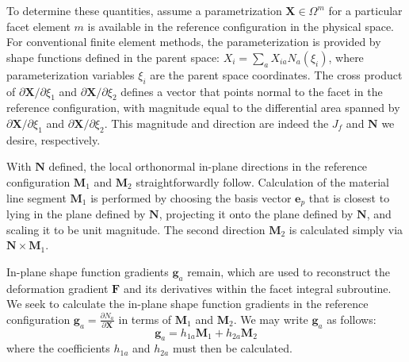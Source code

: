 To determine these quantities, assume a parametrization $\bm{X} \in \Omega^m$ for a particular facet element $m$ is available in the reference configuration in the physical space. For conventional finite element methods, the parameterization is provided by shape functions defined in the parent space: ${X}_{i} = \sum\limits_{a}{X}_{ia}{N}_a(\xi_i)$, where parameterization variables $\xi_i$ are the parent space coordinates. The cross product of ${\partial{\bm {X}}}/{\partial \xi_1}$ and ${\partial{\bm {X}}}/{\partial \xi_2}$ defines a vector that points normal to the facet in the reference configuration, with magnitude equal to the differential area spanned by ${\partial{\bm {X}}}/{\partial \xi_1}$ and ${\partial{\bm {X}}}/{\partial \xi_2}$. This magnitude and direction are indeed the $J_f$ and ${\bm {N}}$ we desire, respectively.

With $\bm{N}$ defined, the local orthonormal in-plane directions in the reference configuration $\bm{M}_1$ and $\bm{M}_2$ straightforwardly follow. Calculation of the material line segment ${\bm {M}}_1$ is performed by choosing the basis vector ${\bm {e}}_p$ that is closest to lying in the plane defined by ${\bm N}$, projecting it onto the plane defined by $\bm{N}$, and scaling it to be unit magnitude. The second direction ${\bm M}_2$ is calculated simply via ${\bm {N}} \times {\bm {M}}_1$.

In-plane shape function gradients $\bm{g}_a$ remain, which are used to reconstruct the deformation gradient $\bm{F}$ and its derivatives within the facet integral subroutine. We seek to calculate the in-plane shape function gradients in the reference configuration $\bm{g}_a = \frac{\partial N_a}{\partial \bm{X}}$ in terms of $\bm{M}_1$ and $\bm{M}_2$. We may write $\bm{g}_a$ as follows:
\begin{equation}
{\bm {g}}_a = {h_{1a}}{\bm {M}}_1 + {h_{2a}}{\bm {M}}_2
\end{equation}
where the coefficients $h_{1a}$ and $h_{2a}$ must then be calculated.

